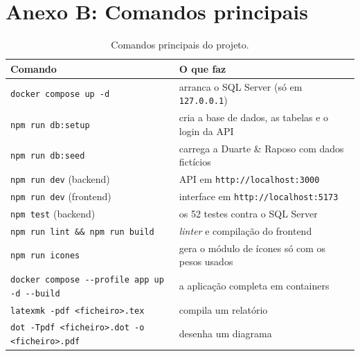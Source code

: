 \documentclass[a4paper,12pt]{article}
\begin{document}
\section*{Anexo B: Comandos principais}

\begin{table}[H]
\centering
\small
\begin{tabularx}{\textwidth}{@{}p{6.4cm}L@{}}
\toprule
\textbf{Comando} & \textbf{O que faz} \\
\midrule
\texttt{docker compose up -d} & arranca o SQL Server (só em \texttt{127.0.0.1}) \\
\texttt{npm run db:setup} & cria a base de dados, as tabelas e o login da API \\
\texttt{npm run db:seed} & carrega a Duarte \& Raposo com dados fictícios \\
\texttt{npm run dev} (backend) & API em \texttt{http://localhost:3000} \\
\texttt{npm run dev} (frontend) & interface em \texttt{http://localhost:5173} \\
\texttt{npm test} (backend) & os 52 testes contra o SQL Server \\
\texttt{npm run lint \&\& npm run build} & \textit{linter} e compilação do frontend \\
\texttt{npm run icones} & gera o módulo de ícones só com os pesos usados \\
\texttt{docker compose -{}-profile app up -d -{}-build} & a aplicação completa em containers \\
\texttt{latexmk -pdf <ficheiro>.tex} & compila um relatório \\
\texttt{dot -Tpdf <ficheiro>.dot -o <ficheiro>.pdf} & desenha um diagrama \\
\bottomrule
\end{tabularx}
\caption{Comandos principais do projeto.}
\label{tab:comandos}
\end{table}
\end{document}
